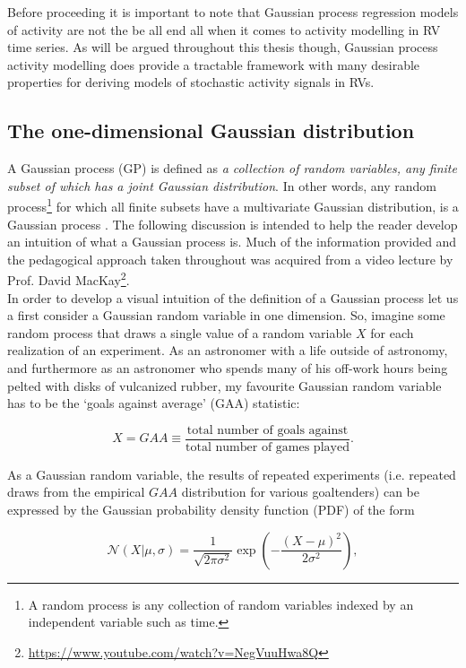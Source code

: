 Before proceeding it is important
to note that Gaussian process regression models of activity are not the be all end all
when it comes to activity modelling in RV time series. As will be argued throughout this
thesis though, Gaussian process activity
modelling does provide a tractable framework with many desirable properties for deriving
models of stochastic activity signals in RVs.

\subsection{The one-dimensional Gaussian distribution}
A Gaussian process (GP) is defined as \emph{a collection of random variables, any
finite subset of which has a joint Gaussian distribution}. In other words,
any random process\footnote{A random process is any collection of random
  variables indexed by an independent variable such as time.} for which all
finite subsets have a multivariate Gaussian distribution, is a Gaussian process
\citep{rasmussen05}. The following discussion is intended to help the reader
develop an intuition of what a Gaussian process is. Much of the information
provided and the pedagogical approach taken throughout was acquired from a video lecture
by Prof. David MacKay\footnote{\url{https://www.youtube.com/watch?v=NegVuuHwa8Q}}. \\

In order to develop a visual intuition of the definition of a Gaussian process
let us a first consider a Gaussian random variable in one dimension. 
So, imagine some random
process that draws a single value of a random variable $X$ for each realization of
an experiment. As an astronomer with a life
outside of astronomy, and furthermore as an astronomer who spends many of his
off-work hours being pelted with %
disks of vulcanized rubber, my favourite
Gaussian random variable has to be the `goals against average' (GAA) statistic:

\begin{equation}
  X = GAA \equiv \frac{\text{total number of goals against}}{\text{total number of games played}}.
\end{equation}

\noindent As a Gaussian random variable, the results of repeated experiments (i.e.
repeated draws from the empirical $GAA$ distribution for various goaltenders) can
be expressed by the Gaussian probability density function (PDF) of the form

\begin{equation}
  \mathcal{N}(X|\mu,\sigma) = \frac{1}{\sqrt{2\pi \sigma^2}} \exp{\left(
    -\frac{(X-\mu)^2}{2\sigma^2} \right)},
  \label{eq:gauss}
\end{equation}

